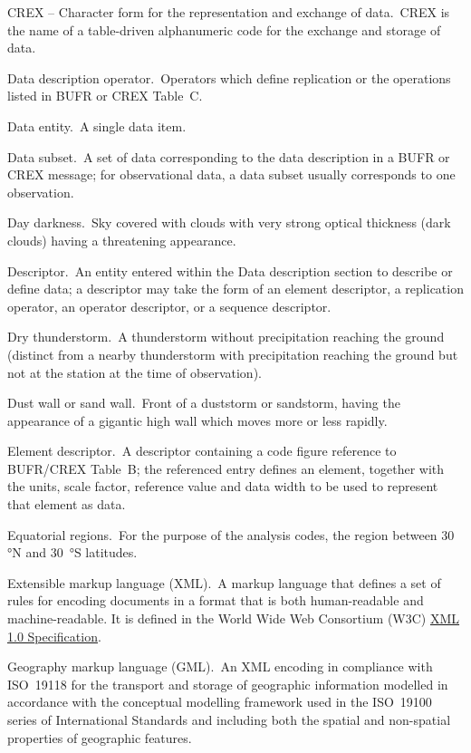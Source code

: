 CREX -- Character form for the representation and exchange of data. CREX is the name of a table-driven alphanumeric code for the exchange and storage of data.

Data description operator. Operators which define replication or the operations listed in BUFR or CREX Table~C.

Data entity. A single data item.

Data subset. A set of data corresponding to the data description in a BUFR or CREX message; for observational data, a data subset usually corresponds to one observation.

Day darkness. Sky covered with clouds with very strong optical thickness (dark clouds) having a threatening appearance.

Descriptor. An entity entered within the Data description section to describe or define data; a descriptor may take the form of an element descriptor, a replication operator, an operator descriptor, or a sequence descriptor.

Dry thunderstorm. A thunderstorm without precipitation reaching the ground (distinct from a nearby thunderstorm with precipitation reaching the ground but not at the station at the time of observation).

Dust wall or sand wall. Front of a duststorm or sandstorm, having the appearance of a gigantic high wall which moves more or less rapidly.

Element descriptor. A descriptor containing a code figure reference to BUFR/CREX Table~B; the referenced entry defines an element, together with the units, scale factor, reference value and data width to be used to represent that element as data.

Equatorial regions. For the purpose of the analysis codes, the region between 30 °N and 30~°S latitudes.

Extensible markup language (XML). A markup language that defines a set of rules for encoding documents in a format that is both human-readable and machine-readable. It is defined in the World Wide Web Consortium (W3C) \href{http://www.w3.org/TR/REC-xml/}{XML 1.0 Specification}.

Geography markup language (GML). An XML encoding in compliance with ISO~19118 for the transport and storage of geographic information modelled in accordance with the conceptual modelling framework used in the ISO~19100 series of International Standards and including both the spatial and non-spatial properties of geographic features.

